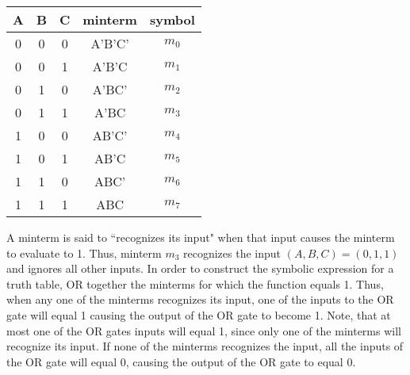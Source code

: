 \begin{tabular}{c|c|c||c|c}
A & B & C & minterm & symbol    \\ \hline
0 & 0 & 0 & A'B'C'  & $m_0$    \\ \hline
0 & 0 & 1 & A'B'C   & $m_1$    \\ \hline
0 & 1 & 0 & A'BC'   & $m_2$    \\ \hline
0 & 1 & 1 & A'BC    & $m_3$    \\ \hline
1 & 0 & 0 & AB'C'   & $m_4$    \\ \hline
1 & 0 & 1 & AB'C    & $m_5$    \\ \hline
1 & 1 & 0 & ABC'    & $m_6$    \\ \hline
1 & 1 & 1 & ABC     & $m_7$    \\
\end{tabular}

A minterm is said to ``recognizes its input" when that input
causes the minterm to evaluate to 1.  Thus, minterm $m_3$ recognizes
the input $(A,B,C)=(0,1,1)$ and ignores all other inputs.  In order
to construct the symbolic expression for a truth table, OR together
the minterms for which the function equals 1. Thus, when any one of
the minterms recognizes its input, one of the inputs to the OR gate
will equal 1 causing the output of the OR gate to become 1.  Note,
that at most one of the OR gates inputs will equal 1, since only one
of the minterms will recognize its input.  If none of the minterms
recognizes the input, all the inputs of the OR gate will equal 0,
causing the output of the OR gate to equal 0.

